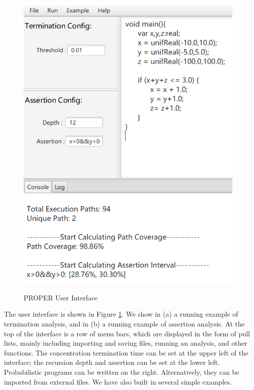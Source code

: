 \documentclass[runningheads]{llncs}
\begin{document}
\begin{figure}[htbp]
{		\includegraphics[scale=0.47]{img/interface2} 
	}
	\caption{PROPER User Interface} %
	\label{interface} %
\end{figure}
The user interface is shown in Figure \ref{interface}. We show in (a) a running example of termination analysis, and in (b) a running example of assertion analysis. At the top of the interface is a row of menu bars, which are displayed in the form of pull lists, mainly including importing and saving files, running an analysis, and other functions. The concentration termination time can be set at the upper left of the interface; the recursion depth and assertion can be set at the lower left. Probabilistic programs can be written on the right. Alternatively, they can be  imported from external files. We have also built in several simple examples. %
\end{document}
